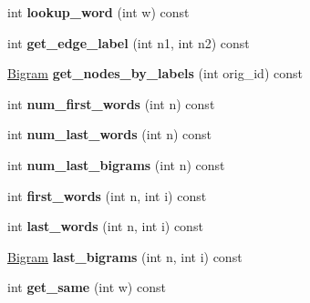 \begin{DoxyCompactItemize}
\item 
\hypertarget{class_forest_lattice_a3921d0378a94ef040246dc87e60df1c7}{
int {\bfseries lookup\_\-word} (int w) const }
\label{class_forest_lattice_a3921d0378a94ef040246dc87e60df1c7}

\item 
\hypertarget{class_forest_lattice_a92e37fd15cd36ae5c9d0e3fe309d876e}{
int {\bfseries get\_\-edge\_\-label} (int n1, int n2) const }
\label{class_forest_lattice_a92e37fd15cd36ae5c9d0e3fe309d876e}

\item 
\hypertarget{class_forest_lattice_a2474198bedc98ef2e3c8a02ebae14f00}{
\hyperlink{struct_bigram}{Bigram} {\bfseries get\_\-nodes\_\-by\_\-labels} (int orig\_\-id) const }
\label{class_forest_lattice_a2474198bedc98ef2e3c8a02ebae14f00}

\item 
\hypertarget{class_forest_lattice_a6fe3508e7fd7d62b44c423dcc113881b}{
int {\bfseries num\_\-first\_\-words} (int n) const }
\label{class_forest_lattice_a6fe3508e7fd7d62b44c423dcc113881b}

\item 
\hypertarget{class_forest_lattice_ae6c29306adee71cca87bb2dc2c1047df}{
int {\bfseries num\_\-last\_\-words} (int n) const }
\label{class_forest_lattice_ae6c29306adee71cca87bb2dc2c1047df}

\item 
\hypertarget{class_forest_lattice_a7fcb5b75caf3d4e17b782849fc847ec9}{
int {\bfseries num\_\-last\_\-bigrams} (int n) const }
\label{class_forest_lattice_a7fcb5b75caf3d4e17b782849fc847ec9}

\item 
\hypertarget{class_forest_lattice_a3b8e0f2d304ad0d9b10d9efb79d7905c}{
int {\bfseries first\_\-words} (int n, int i) const }
\label{class_forest_lattice_a3b8e0f2d304ad0d9b10d9efb79d7905c}

\item 
\hypertarget{class_forest_lattice_a9af5d9ea84e0638599d13c5f78868d92}{
int {\bfseries last\_\-words} (int n, int i) const }
\label{class_forest_lattice_a9af5d9ea84e0638599d13c5f78868d92}

\item 
\hypertarget{class_forest_lattice_a3332ad66005be68e6ac38d7daa40bb9d}{
\hyperlink{struct_bigram}{Bigram} {\bfseries last\_\-bigrams} (int n, int i) const }
\label{class_forest_lattice_a3332ad66005be68e6ac38d7daa40bb9d}

\item 
\hypertarget{class_forest_lattice_a4da765944fa6d5892786ca592ef8c859}{
int {\bfseries get\_\-same} (int w) const }
\label{class_forest_lattice_a4da765944fa6d5892786ca592ef8c859}


\end{DoxyCompactItemize}
